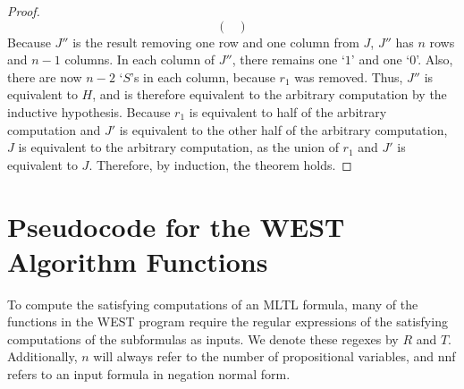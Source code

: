 \documentclass[runningheads]{llncs}
\begin{document}
\begin{proof}
\[\begin{pmatrix}
  \end{pmatrix}
\]
Because $J''$ is the result removing one row and one column from $J$, $J''$ has $n$ rows and $n-1$ columns. In each column of $J''$, there remains one `$1$' and one `$0$'. Also, there are now $n-2$ `$S$'s in each column, because $r_1$ was removed. Thus, $J''$ is equivalent to $H$, and is therefore equivalent to the arbitrary computation by the inductive hypothesis.
Because $r_1$ is equivalent to half of the arbitrary computation and $J'$ is equivalent to the other half of the arbitrary computation, $J$ is equivalent to the arbitrary computation, as the union of $r_1$ and $J'$ is equivalent to $J$.
Therefore, by induction, the theorem holds.
\end{proof}
\section{Pseudocode for the WEST Algorithm Functions} \label{pseudocode_appendix}
To compute the satisfying computations of an MLTL formula, many of the functions in the WEST program require the regular expressions of the satisfying computations of the subformulas as inputs. We denote these regexes by $R$ and $T$. Additionally, $n$ will always refer to the number of propositional variables, and nnf refers to an input formula in negation normal form.\\
\end{document}
